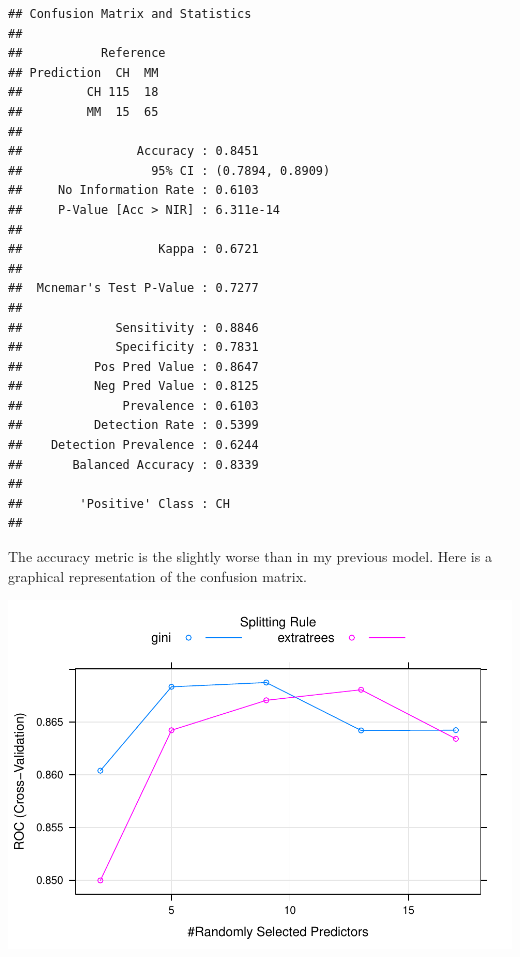 \documentclass[
]{book}
\newenvironment{Shaded}{\begin{snugshade}}{\end{snugshade}}
\newcommand{\DataTypeTok}[1]{\textcolor[rgb]{0.13,0.29,0.53}{#1}}
\newcommand{\DecValTok}[1]{\textcolor[rgb]{0.00,0.00,0.81}{#1}}
\newcommand{\KeywordTok}[1]{\textcolor[rgb]{0.13,0.29,0.53}{\textbf{#1}}}
\newcommand{\NormalTok}[1]{#1}
\newcommand{\OperatorTok}[1]{\textcolor[rgb]{0.81,0.36,0.00}{\textbf{#1}}}
\newcommand{\StringTok}[1]{\textcolor[rgb]{0.31,0.60,0.02}{#1}}
\begin{document}
\begin{verbatim}
## Confusion Matrix and Statistics
## 
##           Reference
## Prediction  CH  MM
##         CH 115  18
##         MM  15  65
##                                           
##                Accuracy : 0.8451          
##                  95% CI : (0.7894, 0.8909)
##     No Information Rate : 0.6103          
##     P-Value [Acc > NIR] : 6.311e-14       
##                                           
##                   Kappa : 0.6721          
##                                           
##  Mcnemar's Test P-Value : 0.7277          
##                                           
##             Sensitivity : 0.8846          
##             Specificity : 0.7831          
##          Pos Pred Value : 0.8647          
##          Neg Pred Value : 0.8125          
##              Prevalence : 0.6103          
##          Detection Rate : 0.5399          
##    Detection Prevalence : 0.6244          
##       Balanced Accuracy : 0.8339          
##                                           
##        'Positive' Class : CH              
## 
\end{verbatim}

The accuracy metric is the slightly worse than in my previous model. Here is a graphical representation of the confusion matrix.

\begin{Shaded}
\end{Shaded}

\includegraphics{data-sci_files/figure-latex/unnamed-chunk-81-1.pdf}
\end{document}

